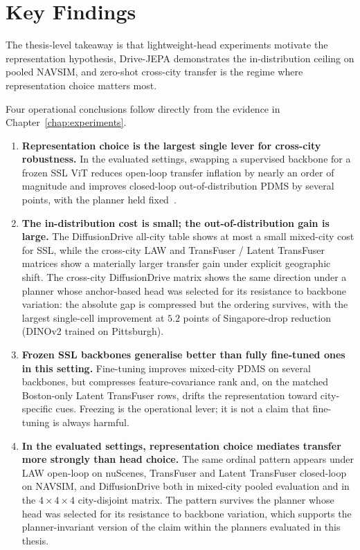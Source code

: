\section{Key Findings}
\label{sec:concl-findings}

The thesis-level takeaway is that lightweight-head experiments motivate the representation hypothesis, Drive-JEPA demonstrates the in-distribution ceiling on pooled NAVSIM, and zero-shot cross-city transfer is the regime where representation choice matters most.

Four operational conclusions follow directly from the evidence in Chapter~\ref{chap:experiments}.

\begin{enumerate}
    \item \textbf{Representation choice is the largest single lever for cross-city robustness.} In the evaluated settings, swapping a supervised backbone for a frozen SSL ViT reduces open-loop transfer inflation by nearly an order of magnitude and improves closed-loop out-of-distribution PDMS by several points, with the planner held fixed~\cite{naeinian-cross-city-2026}.

    \item \textbf{The in-distribution cost is small; the out-of-distribution gain is large.} The DiffusionDrive all-city table shows at most a small mixed-city cost for SSL, while the cross-city LAW and TransFuser / Latent TransFuser matrices show a materially larger transfer gain under explicit geographic shift. The cross-city DiffusionDrive matrix shows the same direction under a planner whose anchor-based head was selected for its resistance to backbone variation: the absolute gap is compressed but the ordering survives, with the largest single-cell improvement at $5.2$ points of Singapore-drop reduction (DINOv2 trained on Pittsburgh).

    \item \textbf{Frozen SSL backbones generalise better than fully fine-tuned ones in this setting.} Fine-tuning improves mixed-city PDMS on several backbones, but compresses feature-covariance rank and, on the matched Boston-only Latent TransFuser rows, drifts the representation toward city-specific cues. Freezing is the operational lever; it is not a claim that fine-tuning is always harmful.

    \item \textbf{In the evaluated settings, representation choice mediates transfer more strongly than head choice.} The same ordinal pattern appears under LAW open-loop on nuScenes, TransFuser and Latent TransFuser closed-loop on NAVSIM, and DiffusionDrive both in mixed-city pooled evaluation and in the $4 \times 4 \times 4$ city-disjoint matrix. The pattern survives the planner whose head was selected for its resistance to backbone variation, which supports the planner-invariant version of the claim within the planners evaluated in this thesis.
\end{enumerate}

